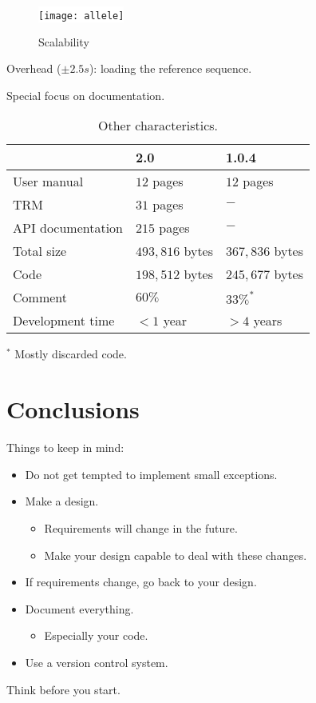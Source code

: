 \documentclass[slidestop]{beamer}
\begin{document}
\begin{frame}
  \begin{figure}
    \colorbox{white} {
      \texttt{[image: allele]}
    }
    \caption{Scalability}
  \end{figure}
  \vspace{-0.5cm}
  Overhead ($\pm 2.5s$): loading the reference sequence.
\end{frame}

\begin{frame}
  Special focus on documentation.

  \begin{table}
    \begin{tabular}{l|l|l}  
                        & 2.0                & 1.0.4 \\
      \hline
      User manual       & $12$ pages         & $12$ pages \\
      TRM               & $31$ pages         & $-$ \\
      API documentation & $215$ pages        & $-$ \\
      Total size        & $493,\!816$ bytes  & $367,\!836$ bytes \\
      Code              & $198,\!512$ bytes  & $245,\!677$ bytes \\
      Comment           & $60\%$             & $33\%^*$ \\
      Development time  & $<1$ year          & $>4$ years
    \end{tabular}
    \caption{Other characteristics.}
  \end{table}

  $^*$ Mostly discarded code.
\end{frame}

\section{Conclusions}
\begin{frame}
  Things to keep in mind:
  \pause
   
  \begin{itemize}
    \item Do not get tempted to implement small exceptions.
    \pause
    \item Make a design.
    \begin{itemize}
      \item Requirements will change in the future.
      \item Make your design capable to deal with these changes.
    \end{itemize}
    \item If requirements change, go back to your design.
    \pause
    \item Document everything.
    \begin{itemize}
      \item Especially your code.
    \end{itemize}
    \pause
    \item Use a version control system.
  \end{itemize}
  \bigskip
  \pause

  Think before you start.
\end{frame}
\end{document}
